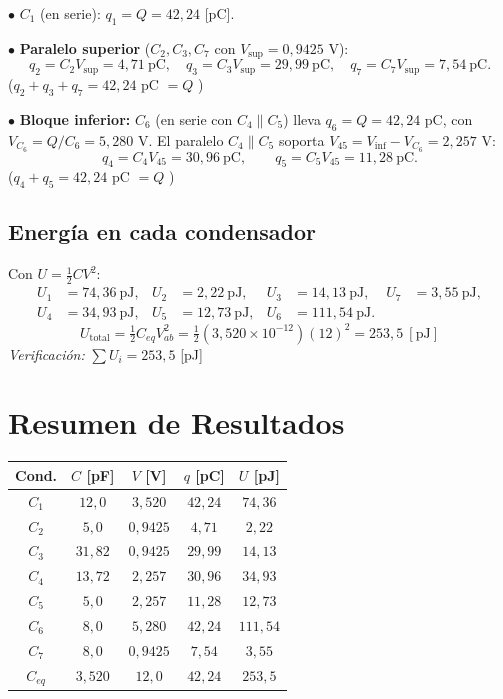 \documentclass[12pt,letterpaper]{article}
\begin{document}
\noindent$\bullet$ \textbf{$C_1$} (en serie): $q_1 = Q = 42{,}24$ [pC].

\noindent$\bullet$ \textbf{Paralelo superior} ($C_2,C_3,C_7$ con $V_{\text{sup}}=0{,}9425$ V):
\[
    q_2 = C_2 V_{\text{sup}} = 4{,}71\ \text{pC},\quad
    q_3 = C_3 V_{\text{sup}} = 29{,}99\ \text{pC},\quad
    q_7 = C_7 V_{\text{sup}} = 7{,}54\ \text{pC}.
\]
($q_2+q_3+q_7 = 42{,}24$ pC $=Q$ \checkmark)

\noindent$\bullet$ \textbf{Bloque inferior:} $C_6$ (en serie con $C_4\!\parallel\!C_5$) lleva
$q_6 = Q = 42{,}24$ pC, con $V_{C_6}=Q/C_6 = 5{,}280$ V. El paralelo $C_4\!\parallel\!C_5$ soporta
$V_{45}=V_{\text{inf}}-V_{C_6}=2{,}257$ V:
\[
    q_4 = C_4 V_{45} = 30{,}96\ \text{pC},\qquad
    q_5 = C_5 V_{45} = 11{,}28\ \text{pC}.
\]
($q_4+q_5 = 42{,}24$ pC $=Q$ \checkmark)

\subsection*{Energ\'ia en cada condensador}

Con $U=\tfrac{1}{2}C V^2$:
\begin{align*}
    U_1 &= 74{,}36\ \text{pJ}, & U_2 &= 2{,}22\ \text{pJ}, & U_3 &= 14{,}13\ \text{pJ}, &
    U_7 &= 3{,}55\ \text{pJ},\\
    U_4 &= 34{,}93\ \text{pJ}, & U_5 &= 12{,}73\ \text{pJ}, & U_6 &= 111{,}54\ \text{pJ}. & &
\end{align*}
\[
    \boxed{U_{\text{total}} = \tfrac{1}{2}C_{eq}V_{ab}^2
        = \tfrac{1}{2}(3{,}520\times10^{-12})(12)^2 = 253{,}5\ [\text{pJ}]}
\]
\noindent\textit{Verificaci\'on:} $\sum U_i = 253{,}5$ [pJ] \checkmark

\section*{Resumen de Resultados}

\begin{center}
\renewcommand{\arraystretch}{1.15}
\begin{tabular}{|c|c|c|c|c|}
\hline
\textbf{Cond.} & \textbf{$C$ [pF]} & \textbf{$V$ [V]} & \textbf{$q$ [pC]} & \textbf{$U$ [pJ]} \\
\hline
$C_1$ & $12{,}0$  & $3{,}520$ & $42{,}24$ & $74{,}36$ \\
$C_2$ & $5{,}0$   & $0{,}9425$ & $4{,}71$ & $2{,}22$ \\
$C_3$ & $31{,}82$ & $0{,}9425$ & $29{,}99$ & $14{,}13$ \\
$C_4$ & $13{,}72$ & $2{,}257$ & $30{,}96$ & $34{,}93$ \\
$C_5$ & $5{,}0$   & $2{,}257$ & $11{,}28$ & $12{,}73$ \\
$C_6$ & $8{,}0$   & $5{,}280$ & $42{,}24$ & $111{,}54$ \\
$C_7$ & $8{,}0$   & $0{,}9425$ & $7{,}54$ & $3{,}55$ \\
\hline
\multicolumn{1}{|c|}{$C_{eq}$} & $3{,}520$ & $12{,}0$ & $42{,}24$ & $253{,}5$ \\
\hline
\end{tabular}
\end{center}
\end{document}
